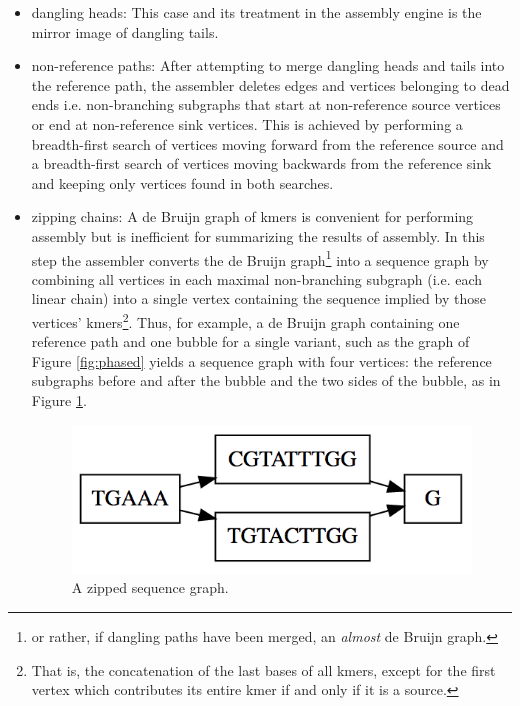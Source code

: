 \documentclass[nofootinbib,amssymb,amsmath]{revtex4}
\begin{document}
\begin{itemize}
\item dangling heads: This case and its treatment in the assembly engine is the mirror image of dangling tails.

\item non-reference paths: After attempting to merge dangling heads and tails into the reference path, the assembler deletes edges and vertices belonging to dead ends i.e. non-branching subgraphs that start at non-reference source vertices or end at non-reference sink vertices.  This is achieved by performing a breadth-first search of vertices moving forward from the reference source and a breadth-first search of vertices moving backwards from the reference sink and keeping only vertices found in both searches.

\item zipping chains: A de Bruijn graph of kmers is convenient for performing assembly but is inefficient for summarizing the results of assembly.  In this step the assembler converts the de Bruijn graph\footnote{or rather, if dangling paths have been merged, an \textit{almost} de Bruijn graph.} into a sequence graph by combining all vertices in each maximal non-branching subgraph (i.e. each linear chain) into a single vertex containing the sequence implied by those vertices' kmers\footnote{That is, the concatenation of the last bases of all kmers, except for the first vertex which contributes its entire kmer if and only if it is a source.}.  Thus, for example, a de Bruijn graph containing one reference path and one bubble for a single variant, such as the graph of Figure \ref{fig:phased} yields a sequence graph with four vertices: the reference subgraphs before and after the bubble and the two sides of the bubble, as in Figure \ref{fig:zipped}.

\begin{figure}
\center
\includegraphics[scale=0.5]{zipped.png}
\caption{A zipped sequence graph.}
\label{fig:zipped}
\end{figure}


\end{itemize}
\end{document}
